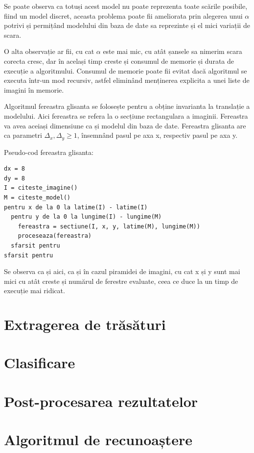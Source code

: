 Se poate observa ca totuși acest model nu poate reprezenta toate scările posibile, fiind un model discret, aceasta problema poate fii ameliorata prin alegerea unui ${\alpha}$ potrivi și permițând modelului din baza de date sa reprezinte și el mici variații de scara.

O alta observație ar fii, cu cat ${\alpha}$ este mai mic, cu atât șansele sa nimerim scara corecta cresc, dar în același timp creste și consumul de memorie și durata de execuție a algoritmului. Consumul de memorie poate fii evitat dacă algoritmul se executa într-un mod recursiv, astfel eliminând menținerea explicita a unei liste de imagini în memorie.

Algoritmul fereastra glisanta se folosește pentru a obține invarianta la translație a modelului.
Aici fereastra se refera la o secțiune rectangulara a imaginii.
Fereastra va avea aceiași dimensiune ca și modelul din baza de date.
Fereastra glisanta are ca parametri ${\Delta_x, \Delta_y \geq 1}$, însemnând pasul pe axa x, respectiv pasul pe axa y.

Pseudo-cod fereastra glisanta:
\begin{mdframed}
\begin{verbatim}
dx = 8
dy = 8
I = citeste_imagine()
M = citeste_model()
pentru x de la 0 la latime(I) - latime(I)
  pentru y de la 0 la lungime(I) - lungime(M)
    fereastra = sectiune(I, x, y, latime(M), lungime(M))
    proceseaza(fereastra)
  sfarsit pentru
sfarsit pentru
\end{verbatim}
\end{mdframed}

Se observa ca și aici, ca și în cazul piramidei de imagini, cu cat x și y sunt mai mici cu atât creste și numărul de ferestre evaluate, ceea ce duce la un timp de execuție mai ridicat.

\pagebreak
\section{Extragerea de trăsături}

\pagebreak
\section{Clasificare}

\pagebreak
\section{Post-procesarea rezultatelor}

\pagebreak
\section{Algoritmul de recunoaștere}